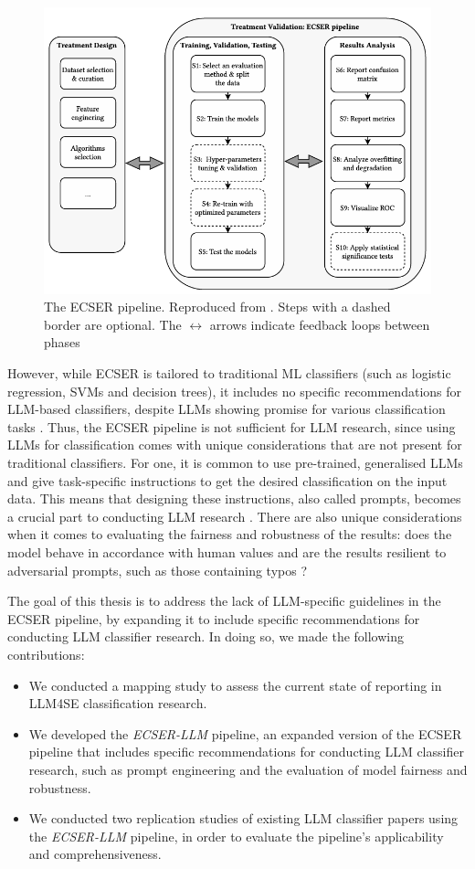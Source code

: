 \documentclass[a4paper]{article}
\newcommand{\newecser}{\textit{ECSER-LLM} }
\begin{document}
\begin{figure}[h]
    \centering
    \includegraphics[width=0.8\linewidth]{figures/ECSER.png}
    \caption{The ECSER pipeline. Reproduced from \textcite{Dellanna2022}. Steps with a dashed border are optional. The $\leftrightarrow$ arrows indicate feedback loops between phases}
    \label{fig:ECSER}
\end{figure}


However, while ECSER is tailored to traditional ML classifiers (such as logistic regression, SVMs and decision trees), it includes no specific recommendations for LLM-based classifiers, despite LLMs showing promise for various classification tasks \cite{Guo2024health,fields2024}. Thus, the ECSER pipeline is not sufficient for LLM research, since using LLMs for classification comes with unique considerations that are not present for traditional classifiers. For one, it is common to use pre-trained, generalised LLMs and give task-specific instructions to get the desired classification on the input data. This means that designing these instructions, also called prompts, becomes a crucial part to conducting LLM research \cite{Marvin2024}. There are also unique considerations when it comes to evaluating the fairness and robustness of the results: does the model behave in accordance with human values and are the results resilient to adversarial prompts, such as those containing typos \cite{Woodworth2017,zhu2024}?


The goal of this thesis is to address the lack of LLM-specific guidelines in the ECSER pipeline, by expanding it to include specific recommendations for conducting LLM classifier research. In doing so, we made the following contributions:
\begin{itemize}
    \item We conducted a mapping study to assess the current state of reporting in LLM4SE classification research.
    \item We developed the \newecser pipeline, an expanded version of the ECSER pipeline that includes specific recommendations for conducting LLM classifier research, such as prompt engineering and the evaluation of model fairness and robustness.
    \item We conducted two replication studies of existing LLM classifier papers using the \newecser pipeline, in order to evaluate the pipeline's applicability and comprehensiveness.
\end{itemize}
\end{document}
